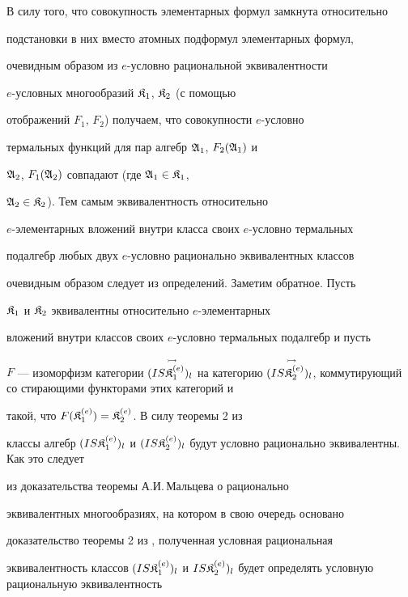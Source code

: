 \begin{pf} 


В силу того, что совокупность элементарных формул замкнута относительно 


подстановки в них вместо атомных подформул элементарных формул, 


очевидным образом из $e$-условно рациональной эквивалентности 


$e$-условных многообразий $\frak K_1$, $\frak K_2$ (с помощью 


отображений $F_1$, $F_2$) получаем, что совокупности $e$-условно 


термальных функций для пар алгебр $\frak A_1$, $F_2(\frak A_1)$ и 


$\frak A_2$, $F_1(\frak  A_2)$ совпадают (где $\frak A_1\in\frak K_1$, 


$\frak A_2\in\frak K_2$). Тем самым эквивалентность относительно 


$e$-элементарных вложений внутри класса своих $e$-условно термальных 


подалгебр любых двух $e$-условно рационально эквивалентных классов 


очевидным образом следует из определений. Заметим обратное. Пусть 


$\frak K_1$ и $\frak K_2$ эквивалентны относительно $e$-элементарных 


вложений внутри классов своих $e$-условно термальных подалгебр и пусть 


$F$ --- изоморфизм категории $(\up{\rightarrowtail}{IS\frak 


K^{(e)}_1)_l}$ на категорию $(\up{\rightarrowtail}{IS\frak 


K^{(e)}_2)_l}$, коммутирующий со стирающими функторами этих категорий и 


такой, что $F(\frak K^{(e)}_1)=\frak K^{(e)}_2$. В силу теоремы 2 из 


\cite{2} классы алгебр $(IS\frak K^{(e)}_1)_l$ и $(IS\frak 


K^{(e)}_2)_l$ будут условно рационально эквивалентны. Как это следует 


из доказательства теоремы А.И.\,Мальцева \cite{3} о рационально 


эквивалентных многообразиях, на котором в свою очередь основано 


доказательство теоремы 2 из \cite{2}, полученная условная рациональная 


эквивалентность классов $(IS\frak K^{(e)}_1)_l$ и $IS\frak 


K^{(e)}_2)_l$ будет определять условную рациональную эквивалентность 



\end{pf}
